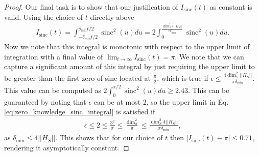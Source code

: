 \documentclass{article}
\newcommand{\norm}[1]{\left|\left| #1 \right|\right|}
\DeclareMathOperator{\sinc}{sinc}
\begin{document}
\begin{proof}
    Our final task is to show that our justification of $I_{\sinc}(t)$ as constant is valid. Using the choice of $t$ directly above
    \begin{align}
        I_{\sinc}(t) = \int_{-\delta_{\min} t /2}^{\delta_{\min} t /2}  \sinc^2(u) du = 2 \int_{0}^{ \frac{\dim_S^2 4 \norm{H_S}} {\epsilon \delta_{\min}}} \sinc^2(u) du. \label{eq:zero_knowledge_sinc_integral}
    \end{align}
    Now we note that this integral is monotonic with respect to the upper limit of integration with a final value of $\lim_{t \to \infty} I_{\sinc}(t) = \pi$. We note that we can capture a significant amount of this integral by just requiring the upper limit to be greater than the first zero of sinc located at $\frac{\pi}{2}$, which is true if $\epsilon \le \frac{4 \dim_S^2 \norm{H_S}}{\pi \delta_{\min}}$. This value can be computed as $2 \int_0^{\pi / 2} \sinc^2(u) du \ge 2.43$. This can be guaranteed by noting that $\epsilon$ can be at most 2, so the upper limit in Eq. \eqref{eq:zero_knowledge_sinc_integral} is satisfied if
    \begin{align}
    \epsilon \le 2 \le \frac{3^2}{\pi} \le \frac{\dim_S^2}{\pi} \le \frac{\dim_S^2 4 \norm{H_S}}{\pi \delta_{\min}},
\end{align}
as $\delta_{\min} \le 4 \norm{H_S}$. This shows that for our choice of $t$ then $|I_{\sinc}(t) - \pi| \le 0.71$, rendering it asymptotically constant.
\end{proof}
\end{document}
